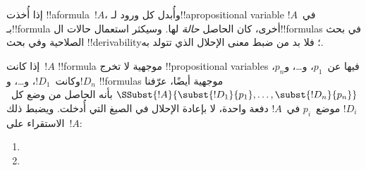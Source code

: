 \documentclass[../../../include/open-logic-section]{subfiles}
\begin{document}


إذا أُخذت !!a{formula}~$!A$، وأُبدل كل ورود لـ!!a{propositional variable}
في~$!A$ بـ!!{formula} أخرى، كان الحاصل \emph{حالة} لها. وسيكثر
استعمال حالات ال!!{formula}s في بحث الصلاحية وفي بحث
!!{derivability}؛ فلا بد من ضبط معنى الإحلال الذي تتولد به.

\begin{defn}
  إذا كانت~$!A$ !!{formula} موجهية لا تخرج !!{propositional
    variable}s فيها عن~$p_1$، و\dots، و$p_n$، وكانت~$!D_1$، و\dots،
  و$!D_n$ !!{formula}s موجهية أيضًا، عرّفنا
  $\SSubst{!A}{\subst{!D_1}{p_1}, \dots, \subst{!D_n}{p_n}}$ بأنه
  الحاصل من وضع كل~$!D_i$ موضع~$p_i$ في~$!A$ دفعة واحدة،
  لا بإعادة الإحلال في الصيغ التي أُدخلت. ويضبط ذلك الاستقراء على~$!A$:
  \begin{enumerate}
    \item {}
    \item {}

\end{enumerate}
\end{defn}
\end{document}

